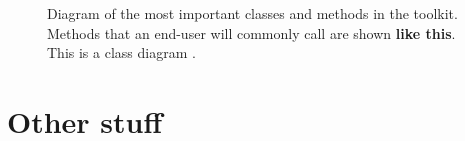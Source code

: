 \documentclass[a4paper,10pt]{article}
\newcommand{\methodused}[1]{{\bfseries #1}}
\begin{document}
\begin{figure}
\caption{Diagram of the most important classes and methods in the toolkit.
Methods that an end-user will commonly call are shown \methodused{like this}.
This is a class diagram \citep{wiki:cd}.
\label{fig:cd}%
}
\end{figure}

\clearpage
\section{Other stuff}

\printglossaries



\end{document}
